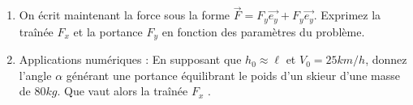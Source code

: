 \begin{enumerate}

\item 
On écrit maintenant la force sous la forme $\vec{F}  = F_y \vec{e_y} + F_y \vec{e_y} $. Exprimez la traînée $F_x$ et la portance $F_y$ en fonction des paramètres du problème.

\item Applications numériques : En supposant que $h_0 \approx \ell$  et $V_0 = 25 km/h$, donnez l'angle $\alpha$ générant une portance équilibrant le poids d'un skieur d'une masse de $80kg$.
Que vaut alors la traînée $F_x$ .


\end{enumerate}



